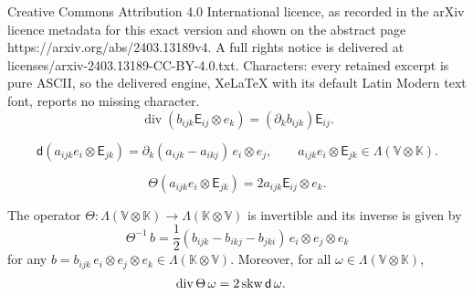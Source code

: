 \documentclass[10pt,a4paper]{amsart}
\newcommand{\EK}{\mathsf{E}}
\newcommand{\K}{\mathbb{K}}
\newcommand{\V}{\mathbb{V}}
\newcommand{\dd}{\mathsf{d}}
\newcommand{\dive}{{\ensuremath\mathop{\mathrm{div}\,}}} %
\DeclareMathOperator{\divg}{div}
\newcommand\skw{\operatorname{skw}}
\begin{document}
Creative Commons Attribution 4.0 International licence, as recorded in the arXiv licence metadata for this exact version and shown on the abstract page https://arxiv.org/abs/2403.13189v4. A full rights notice is delivered at licenses/arxiv-2403.13189-CC-BY-4.0.txt. Characters: every retained excerpt is pure ASCII, so the delivered engine, XeLaTeX with its default Latin Modern text font, reports no missing character.
\begin{equation}
  \label{eq:div-KV}
  \divg (b_{ijk} \EK_{ij} \otimes e_k) = (\partial_k b_{ijk}) \EK_{ij}.
\end{equation}

\begin{equation}
  \label{eq:dd-2}
  \dd ( a_{ijk} e_i \otimes \EK_{jk}) = \partial_k( a_{ijk} - a_{ikj}) \,
  e_i \otimes e_j,
  \qquad  a_{ijk} e_i \otimes \EK_{jk}\in \Lambda(\V \otimes \K).  
\end{equation}

\begin{equation}
  \label{eq:Theta-def-2}
\Theta (a_{ijk} e_i \otimes \EK_{jk}) = 2 a_{ijk} \EK_{ij} \otimes
e_k.  
\end{equation}

\begin{lemma}
  The operator
  $ \Theta: \Lambda(\V \otimes \K) \rightarrow \Lambda(\K \otimes \V)$
  is invertible and  its inverse is given by
  \[
    \Theta^{-1}\, b
    = \frac 1 2 (b_{ijk} - b_{ikj} - b_{jki}) \,e_i \otimes e_j \otimes e_k
  \]
  for any $b = b_{ijk} \, e_i \otimes e_j \otimes e_k\in \Lambda(\K \otimes \V)$.
  Moreover, for all $\omega \in \Lambda(\V \otimes \K)$, 
  \begin{align}
    \dive \Theta \,\omega 
    & = 2 \skw \dd \,\omega. 
      \label{applemma2-1}       
  \end{align}
\end{lemma}
\end{document}

